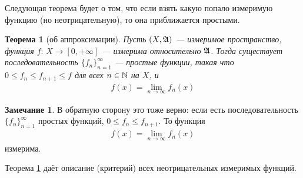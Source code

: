 \documentclass[a4paper,14pt]{extarticle}
\newcounter{theoremCnt}
\theoremstyle{definition}
\theoremstyle{plain}
\newtheorem{thm}[theoremCnt]{Теорема}
\theoremstyle{plain}
\theoremstyle{plain}
\theoremstyle{plain}
\theoremstyle{definition}
\theoremstyle{definition}
\newtheorem{remrk}[theoremCnt]{Замечание}
\theoremstyle{definition}
\theoremstyle{definition}
\theoremstyle{definition}
\theoremstyle{definition}
\theoremstyle{plain}
\theoremstyle{plain}
\theoremstyle{plain}
\theoremstyle{plain}
\theoremstyle{definition}
\theoremstyle{definition}
\theoremstyle{definition}
\theoremstyle{definition}
\theoremstyle{definition}
\newcommand{\N}{\ensuremath \mathbb{N}}
\newcommand{\A}{\ensuremath \mathfrak{A}}
\begin{document}
Следующая теорема будет о том, что если взять какую попало измеримую функцию (но неотрицательную), то она приближается простыми.

\begin{thm}[об аппроксимации]
 \label{theorem:approximation}
 Пусть $(X, \A)$ --- измеримое пространство, функция $f \colon\, X \to [0, +\infty]  $ --- измерима относительно $\A$. Тогда существует последовательность $\{f_{n}\}_{n=1}^{\infty} $ --- простые функции, такая что $0 \leqslant f_n \leqslant f_{n+1} \leqslant f$ для всех $n \in \N$ на $X$, и \begin{align*}
  f(x) = \lim\limits_{n \to \infty} f_n(x)
 \end{align*} 
\end{thm}
\begin{remrk}
 В обратную сторону это тоже верно: если есть последовательность $\{f_{n}\}_{n=1}^{\infty} $ простых функций, $0 \leqslant f_n \leqslant f_{n+1}$. То функция \begin{align*}
  f(x) = \lim\limits_{n \to \infty} f_n(x)
 \end{align*} измерима.

 Теорема \ref{theorem:approximation} даёт описание (критерий) всех неотрицательных измеримых функций.
\end{remrk}
\end{document}

